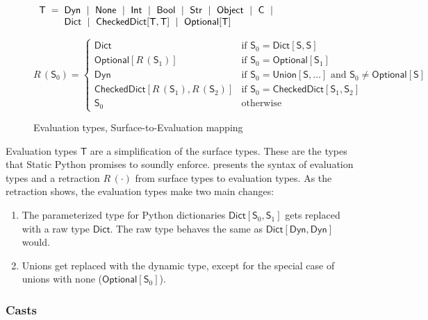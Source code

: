 \documentclass[english,cleveref,submission]{programming}
\makeatletter
\newcommand{\SP}{Static Python}
\newcommand{\defeq}{=}
\newcommand{\mfeq}{=}
\newcommand{\langmid}{~\mid~} %
\newenvironment{langarray}{\(\begin{array}{l@{\hspace{2mm}}c@{\hspace{2mm}}l}}{\end{array}\)}
\newcommand{\typefont}[1]{\mathsf{#1}}
\newcommand{\paramtype}[2]{#1[#2]}
\newcommand{\sptype}{\typefont{S}}
\newcommand{\spteval}{\typefont{T}}
\newcommand{\sptclass}{\typefont{C}}
\newcommand{\sptint}{\typefont{Int}}
\newcommand{\sptstr}{\typefont{Str}}
\newcommand{\sptbool}{\typefont{Bool}}
\newcommand{\sptdyn}{\typefont{Dyn}}
\newcommand{\sptobject}{\typefont{Object}}
\newcommand{\sptnone}{\typefont{None}}
\newcommand{\sptoptional}[1]{\paramtype{\typefont{Optional}}{#1}}
\newcommand{\sptunion}[1]{\paramtype{\typefont{Union}}{#1}}
\newcommand{\sptrawpydict}{\typefont{Dict}}
\newcommand{\sptrawchkdict}{\typefont{CheckedDict}} %
\newcommand{\sptpydict}[2]{\paramtype{\sptrawpydict}{#1, #2}}
\newcommand{\sptchkdict}[2]{\paramtype{\sptrawchkdict}{#1, #2}}
\newcommand{\mfapply}[2]{#1\,(#2)}
\newcommand{\mffont}[1]{\mathit{#1}}
\newcommand{\mftypeF}[1]{\mfapply{\mffont{R}}{#1}} %
\makeatother
\begin{document}
\begin{figure}[t]
  \begin{langarray}
    \spteval & \defeq &
      \sptdyn \langmid
      \sptnone \langmid
      \sptint \langmid
      \sptbool \langmid
      \sptstr \langmid
      \sptobject \langmid
      \sptclass \langmid
    \\ & &
      \sptrawpydict \langmid
      \sptchkdict{\spteval}{\spteval} \langmid
      \sptoptional{\spteval}
  \end{langarray}

  \bigskip
  \(
    \mftypeF{\sptype_0}
    \mfeq
    \left\{\begin{array}{ll}
      \sptrawpydict & \mbox{if $\sptype_0 = \sptpydict{\sptype}{\sptype}$}
    \\
      \sptoptional{\mftypeF{\sptype_1}} & \mbox{if $\sptype_0 = \sptoptional{\sptype_1}$}
    \\
      \sptdyn & \mbox{if $\sptype_0 = \sptunion{\sptype, \ldots}$ and $\sptype_0 \neq \sptoptional{\sptype}\!\!\!\!$}
    \\
      \sptchkdict{\mftypeF{\sptype_1}}{\mftypeF{\sptype_2}} & \mbox{if $\sptype_0 = \sptchkdict{\sptype_1}{\sptype_2}$}
    \\
      \sptype_0 & \mbox{otherwise}
    \end{array}\right.
  \)

  \caption{Evaluation types, Surface-to-Evaluation mapping}
  \label{f:surface-to-eval-types}
\end{figure}

Evaluation types $\spteval$ are a simplification of the surface types.
These are the types that \SP{} promises to soundly enforce.
 presents the syntax of evaluation types
and a retraction $\mftypeF{\cdot}$ from surface types to evaluation types.
As the retraction shows, the evaluation types make two main changes:
\begin{enumerate}
  \item
    The parameterized type for Python dictionaries
    $\sptpydict{\sptype_0}{\sptype_1}$ gets replaced with
    a raw type $\sptrawpydict$.
    The raw type behaves the same as $\sptpydict{\sptdyn}{\sptdyn}$ would.
  \item
    Unions get replaced with the dynamic type, except for the special case
    of unions with none ($\sptoptional{\sptype_0}$).
\end{enumerate}


\subsubsection{Casts}
\end{document}
